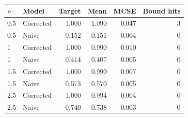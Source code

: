 \begin{tabular}{llrrrr}
\toprule
$\nu$ & Model & Target & Mean & MCSE & Bound hits\\
\midrule
0.5 & Corrected & 1.000 & 1.090 & 0.047 & 3\\
0.5 & Naive & 0.152 & 0.151 & 0.004 & 0\\
1 & Corrected & 1.000 & 0.990 & 0.010 & 0\\
1 & Naive & 0.414 & 0.407 & 0.005 & 0\\
1.5 & Corrected & 1.000 & 0.990 & 0.007 & 0\\
1.5 & Naive & 0.573 & 0.570 & 0.005 & 0\\
2.5 & Corrected & 1.000 & 0.994 & 0.004 & 0\\
2.5 & Naive & 0.740 & 0.738 & 0.003 & 0\\
\bottomrule
\end{tabular}
